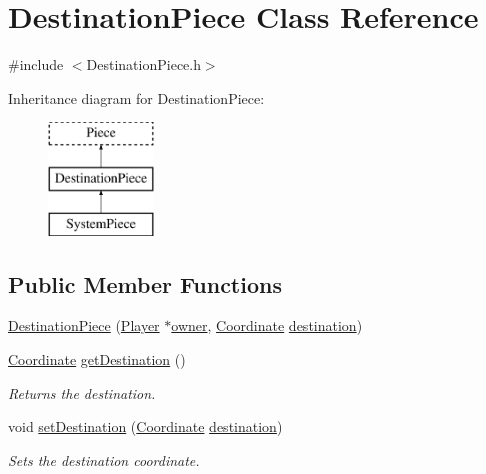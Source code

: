 \hypertarget{classDestinationPiece}{\section{Destination\-Piece Class Reference}
\label{classDestinationPiece}
}


{\ttfamily \#include $<$Destination\-Piece.\-h$>$}

Inheritance diagram for Destination\-Piece\-:\begin{figure}[H]
\begin{center}
\leavevmode
\includegraphics[height=3.000000cm]{classDestinationPiece}
\end{center}
\end{figure}
\subsection*{Public Member Functions}
\begin{DoxyCompactItemize}
\item 
\hyperlink{classDestinationPiece_a6157318c1a312597dafa26c895077ebd}{Destination\-Piece} (\hyperlink{classPlayer}{Player} $\ast$\hyperlink{classPiece_a43beac3b5268343b9f7e575d637eda98}{owner}, \hyperlink{structCoordinate}{Coordinate} \hyperlink{classDestinationPiece_acd3a864aa8c242f3b8b7d27195a2d879}{destination})
\item 
\hyperlink{structCoordinate}{Coordinate} \hyperlink{classDestinationPiece_a6a6d7885523146bc18730d249060e37c}{get\-Destination} ()
\begin{DoxyCompactList}\small\item\em Returns the destination. \end{DoxyCompactList}\item 
void \hyperlink{classDestinationPiece_af0443c30ba2a07eb060f8b89040f5cd1}{set\-Destination} (\hyperlink{structCoordinate}{Coordinate} \hyperlink{classDestinationPiece_acd3a864aa8c242f3b8b7d27195a2d879}{destination})
\begin{DoxyCompactList}\small\item\em Sets the destination coordinate. \end{DoxyCompactList}\end{DoxyCompactItemize}
